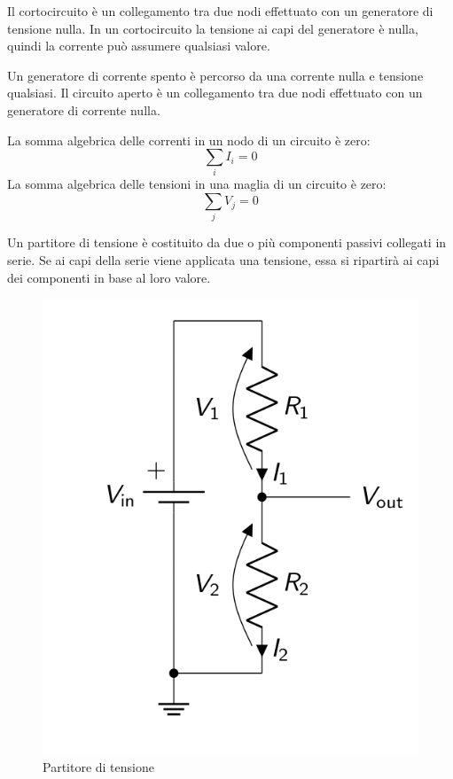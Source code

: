 \begin{defn}[Cortocircuito]
	Il cortocircuito è un collegamento tra due nodi effettuato con un generatore di tensione nulla. In un cortocircuito la tensione ai capi del generatore è nulla, quindi la corrente può assumere qualsiasi valore.
\end{defn}

\begin{defn}
	Un generatore di corrente spento è percorso da una corrente nulla e tensione qualsiasi.
	Il circuito aperto è un collegamento tra due nodi effettuato con un generatore di corrente nulla.
\end{defn}

\begin{defn}
	La somma algebrica delle correnti in un nodo di un circuito è zero: $$ \sum_{i} I_i = 0 $$
	La somma algebrica delle tensioni in una maglia di un circuito è zero: $$ \sum_{j} V_j = 0 $$
\end{defn}

\begin{defn}
	Un partitore di tensione è costituito da due o più componenti passivi collegati in serie.
	Se ai capi della serie viene applicata una tensione, essa si ripartirà ai capi dei componenti in base al loro valore.
	\begin{figure}[H]
		\centering
		\includegraphics[width=0.5\linewidth]{figures/partitore_tensione.png}
		\caption{Partitore di tensione}
		\label{fig:partitore_tensione}
	\end{figure}
\end{defn}

